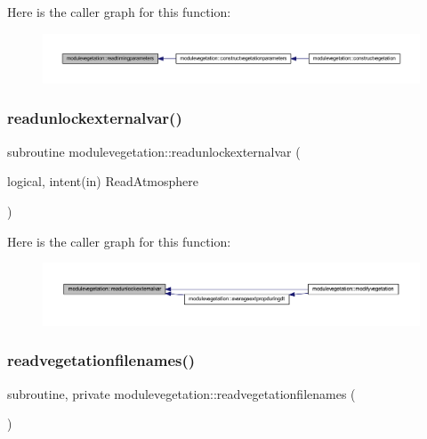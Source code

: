 Here is the caller graph for this function\+:\nopagebreak
\begin{figure}[H]
\begin{center}
\leavevmode
\includegraphics[width=350pt]{namespacemodulevegetation_a9b539132b7ee0190f99651024f4550ee_icgraph}
\end{center}
\end{figure}
\mbox{\label{namespacemodulevegetation_adc5d72657ff85d4a70bd5b3345b65563}} 
\subsubsection{\texorpdfstring{readunlockexternalvar()}{readunlockexternalvar()}}
{\footnotesize\ttfamily subroutine modulevegetation\+::readunlockexternalvar (\begin{DoxyParamCaption}\item[{logical, intent(in)}]{Read\+Atmosphere }\end{DoxyParamCaption})\hspace{0.3cm}{\ttfamily [private]}}

Here is the caller graph for this function\+:\nopagebreak
\begin{figure}[H]
\begin{center}
\leavevmode
\includegraphics[width=350pt]{namespacemodulevegetation_adc5d72657ff85d4a70bd5b3345b65563_icgraph}
\end{center}
\end{figure}
\mbox{\label{namespacemodulevegetation_a8edd281bd5f3e5d91a3fea4575a31396}} 
\subsubsection{\texorpdfstring{readvegetationfilenames()}{readvegetationfilenames()}}
{\footnotesize\ttfamily subroutine, private modulevegetation\+::readvegetationfilenames (\begin{DoxyParamCaption}{ }\end{DoxyParamCaption})\hspace{0.3cm}{\ttfamily [private]}}

